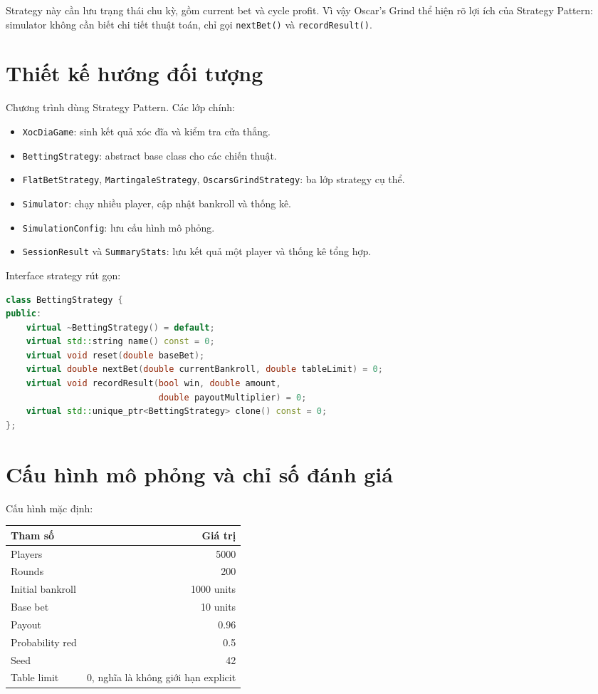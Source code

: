 \documentclass[12pt,a4paper]{article}
\begin{document}
Strategy này cần lưu trạng thái chu kỳ, gồm current bet và cycle profit. Vì vậy Oscar's Grind thể hiện rõ lợi ích của Strategy Pattern: simulator không cần biết chi tiết thuật toán, chỉ gọi \texttt{nextBet()} và \texttt{recordResult()}.

\section{Thiết kế hướng đối tượng}
Chương trình dùng Strategy Pattern. Các lớp chính:
\begin{itemize}
  \item \texttt{XocDiaGame}: sinh kết quả xóc đĩa và kiểm tra cửa thắng.
  \item \texttt{BettingStrategy}: abstract base class cho các chiến thuật.
  \item \texttt{FlatBetStrategy}, \texttt{MartingaleStrategy}, \texttt{OscarsGrindStrategy}: ba lớp strategy cụ thể.
  \item \texttt{Simulator}: chạy nhiều player, cập nhật bankroll và thống kê.
  \item \texttt{SimulationConfig}: lưu cấu hình mô phỏng.
  \item \texttt{SessionResult} và \texttt{SummaryStats}: lưu kết quả một player và thống kê tổng hợp.
\end{itemize}

Interface strategy rút gọn:
\begin{lstlisting}[language=C++]
class BettingStrategy {
public:
    virtual ~BettingStrategy() = default;
    virtual std::string name() const = 0;
    virtual void reset(double baseBet);
    virtual double nextBet(double currentBankroll, double tableLimit) = 0;
    virtual void recordResult(bool win, double amount,
                              double payoutMultiplier) = 0;
    virtual std::unique_ptr<BettingStrategy> clone() const = 0;
};
\end{lstlisting}

\section{Cấu hình mô phỏng và chỉ số đánh giá}
Cấu hình mặc định:
\begin{table}[h]
\centering
\begin{tabular}{lr}
\toprule
Tham số & Giá trị \\
\midrule
Players & 5000 \\
Rounds & 200 \\
Initial bankroll & 1000 units \\
Base bet & 10 units \\
Payout & 0.96 \\
Probability red & 0.5 \\
Seed & 42 \\
Table limit & 0, nghĩa là không giới hạn explicit \\
\bottomrule
\end{tabular}
\end{table}
\end{document}
